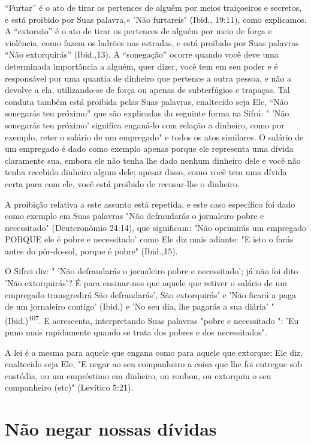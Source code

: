 ``Furtar'' é o ato de tirar os pertences de alguém por meios traiçoei­ros
e secretos, e está proibido por Suas palavra,« 'Não furtareis" (Ibid.,
19:11), como explicamos. A ``extorsão'' é o ato de tirar os pertences de
alguém por meio de força e violência, como fazem os ladrões nas
estradas, e está proibido por Suas palavras ``Não extorquirás''
(Ibid.,13). A ``sonegação'' ocorre quando você deve uma determinada
importância a alguém, quer dizer, você tem em seu poder e é responsável
por uma quantia de dinheiro que pertence a outra pessoa, e não a devolve
a ela, utilizando-se de força ou apenas de subterfúgios e trapaças. Tal
conduta também está proibida pelas Suas palavras, enaltecido seja Ele,
``Não sonegarás teu próximo'' que são explicadas da seguinte forma na
Sifrá: " 'Não sonegarás teu próximo' significa enganá-lo com relação a
di­nheiro, como por exemplo, reter o salário de um empregado" e todos os
atos similares. O salário de um empregado é dado como exemplo apenas
porque ele representa uma dívida claramente sua, embora ele não tenha
lhe dado ne­nhum dinheiro dele e você não tenha recebido dinheiro algum
dele; apesar dis­so, como você tem uma dívida certa para com ele, você
está proibido de recusar-lhe o dinheiro.

A proibição relativa a este assunto está repetida, e este caso
específi­co foi dado como exemplo em Suas palavras "Não defraudarás o
jornaleiro po­bre e necessitado" (Deuteronômio 24:14), que significam:
"Não oprimirás um empregado PORQUE ele é pobre e necessitado' como Ele
diz mais adiante: "E isto o farás antes do pôr-do-sol, porque é pobre"
(Ibid.,15).

O Sifrei diz: " 'Não defraudarás o jornaleiro pobre e necessitado'; já
não foi dito 'Não extorquirás'? É para ensinar-nos que aquele que
retiver o salá­rio de um empregado transgredirá São defraudarás', São
extorquirás' e 'Não ficará a paga de um jornaleiro contigo' (Ibid.) e
'No seu dia, lhe pagarás a sua diária' " 
(Ibid.)\textsuperscript{407}. E acrescenta, interpretando Suas
palavras "pobre e necessitado
": 'Eu puno mais rapidamente quando se trata dos pobres e dos
necessitados".


A lei é a mesma para aquele que engana como para aquele que extor­que;
Ele diz, enaltecido seja Ele, "E negar ao seu companheiro a coisa que
lhe foi entregue sob custódia, ou um empréstimo em dinheiro, ou roubou,
ou ex­torquiu o seu companheiro (etc)" (Levítico 5:21).

\section{Não negar nossas dívidas}

